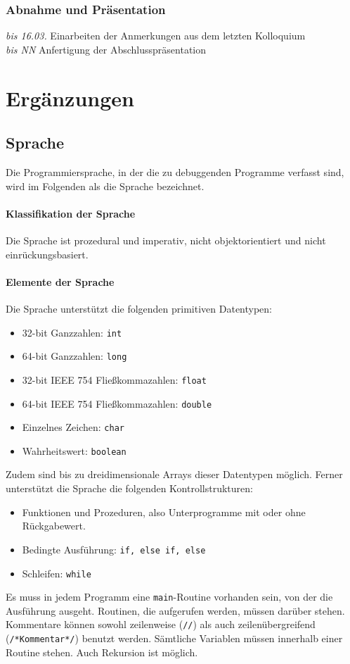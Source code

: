 \documentclass[parskip=full]{scrartcl}
\begin{document}
\subsubsection{Abnahme und Präsentation }
\textit{bis 16.03.} Einarbeiten der Anmerkungen aus dem letzten Kolloquium \\
\textit{bis NN} Anfertigung der Abschlusspräsentation

\section{Ergänzungen}
\subsection{Sprache}
Die Programmiersprache, in der die zu debuggenden Programme verfasst sind, wird im Folgenden als die Sprache bezeichnet. 
\paragraph{Klassifikation der Sprache} Die Sprache ist prozedural und imperativ, nicht objektorientiert und nicht einrückungsbasiert.
\paragraph{Elemente der Sprache}
Die Sprache unterstützt die folgenden primitiven Datentypen:
\begin{itemize}
\item  32-bit Ganzzahlen: \texttt{int}
  \item  64-bit Ganzzahlen: \texttt{long}
 \item  32-bit IEEE 754 Fließkommazahlen: \texttt{float}
 \item   64-bit IEEE 754 Fließkommazahlen: \texttt{double}
  \item  Einzelnes Zeichen: \texttt{char}
  \item  Wahrheitswert: \texttt{boolean}
\end{itemize}
Zudem sind bis zu dreidimensionale Arrays dieser Datentypen möglich.
Ferner unterstützt die Sprache die folgenden Kontrollstrukturen:
\begin{itemize}
\item Funktionen und Prozeduren, also Unterprogramme mit oder ohne Rückgabewert.
\item Bedingte Ausführung: \texttt{if, else if, else}
\item Schleifen: \texttt{while}
\end{itemize}
Es muss in jedem Programm eine \texttt{main}-Routine vorhanden sein, von der die Ausführung ausgeht. Routinen, die aufgerufen werden, müssen darüber stehen. Kommentare können sowohl zeilenweise (\texttt{//}) als auch zeilenübergreifend (\texttt{/*Kommentar*/}) benutzt werden. Sämtliche Variablen müssen innerhalb einer Routine stehen. Auch Rekursion ist möglich.
\end{document}

